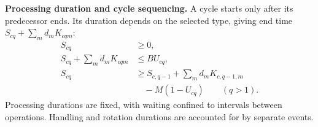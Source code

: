 \documentclass[final,5p,times,twocolumn]{elsarticle}
\begin{document}
\noindent\textbf{Processing duration and cycle sequencing.}
A cycle starts only after its predecessor ends. Its duration depends on the selected type, giving end time $S_{cq}+\sum_m d_mK_{cqm}$:
\begin{equation}
\begin{aligned}
S_{cq}&\ge0,\\
S_{cq}+\sum_m d_mK_{cqm}&\le B U_{cq},\\
S_{cq}&\ge S_{c,q-1}+\sum_m d_mK_{c,q-1,m}\\
&\quad-M(1-U_{cq})\qquad(q>1).
\end{aligned}
\label{eq:cycle-time-cn}
\end{equation}
Processing durations are fixed, with waiting confined to intervals between operations. Handling and rotation durations are accounted for by separate events.
\end{document}

